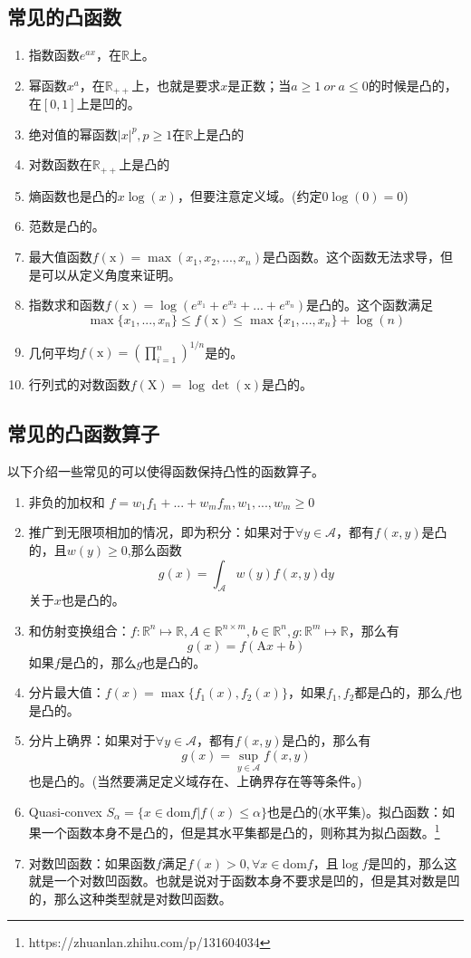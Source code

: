 \documentclass[a4paper]{D:/MyRepo/Script/latex/PaperReadingLog}
\begin{document}
\subsection{常见的凸函数}
\begin{enumerate}
    \item 指数函数$e^{ax}$，在$\mathbb{R}$上。
    \item 幂函数$x^a$，在$\mathbb{R}_{++}$上，也就是要求$x$是正数；当$a\ge 1\  or\ a\le0$的时候是凸的，在$[0,1]$上是凹的。
    \item 绝对值的幂函数$\lvert x \lvert^p,p\ge 1$在$\mathbb{R}$上是凸的
    \item 对数函数在$\mathbb{R}_{++}$上是凸的
    \item 熵函数也是凸的$x\log(x)$，但要注意定义域。(约定$0\log(0)=0$)
    \item 范数是凸的。
    \item 最大值函数$f(\mathrm{x})=\max(x_1,x_2,...,x_n)$是凸函数。这个函数无法求导，但是可以从定义角度来证明。
    \item 指数求和函数$f(\mathrm{x})=\log(e^{x_1}+e^{x_2}+...+e^{x_n})$是凸的。这个函数满足
    $$
    \max\{x_1,...,x_n\}\le f(\mathrm{x})\le \max\{x_1,...,x_n\}+\log(n)
    $$
    \item 几何平均$f(\mathrm{x})=(\prod_{i=1}^n)^{1/n}$是的。
    \item 行列式的对数函数$f(\mathrm{X})=\log\det(\mathrm{x})$是凸的。
\end{enumerate}

\subsection{常见的凸函数算子}
以下介绍一些常见的可以使得函数保持凸性的函数算子。
\begin{enumerate}
    \item 非负的加权和 $f=w_1f_1+...+w_mf_m,w_1,...,w_m\ge 0$
    \item 推广到无限项相加的情况，即为积分：如果对于$\forall y\in\mathcal{A}$，都有$f(x,y)$是凸的，且$w(y)\ge 0$,那么函数
    $$
    g(x)=\int_{\mathcal{A}}w(y)f(x,y)\mathrm{d}y
    $$
    关于$x$也是凸的。
    \item 和仿射变换组合：$f:\mathbb{R}^n\mapsto \mathbb{R},A\in\mathbb{R}^{n\times m},b\in \mathbb{R}^n,g:\mathbb{R}^m\mapsto\mathbb{R}$，那么有
    $$
    g(x)=f(\mathrm{A}x+b)
    $$
    如果$f$是凸的，那么$g$也是凸的。
    \item 分片最大值：$f(x)=\max\{f_1(x),f_2(x)\}$，如果$f_1,f_2$都是凸的，那么$f$也是凸的。
    \item 分片上确界：如果对于$\forall y\in\mathcal{A}$，都有$f(x,y)$是凸的，那么有
    $$
    g(x)=\sup_{y\in\mathcal{A}}f(x,y)
    $$
    也是凸的。(当然要满足定义域存在、上确界存在等等条件。)
    \item Quasi-convex $S_\alpha=\{x\in\mathrm{dom}f|f(x)\le\alpha\}$也是凸的(水平集)。拟凸函数：如果一个函数本身不是凸的，但是其水平集都是凸的，则称其为拟凸函数。\footnote{https://zhuanlan.zhihu.com/p/131604034}
    \item 对数凹函数：如果函数$f$满足$f(x)>0,\forall x\in\mathrm{dom}f$，且$\log f$是凹的，那么这就是一个对数凹函数。也就是说对于函数本身不要求是凹的，但是其对数是凹的，那么这种类型就是对数凹函数。
\end{enumerate}
\end{document}
